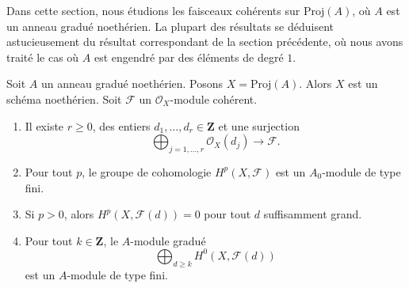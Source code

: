 \noindent
Dans cette section, nous étudions les faisceaux cohérents sur $\text{Proj}(A)$,
où $A$ est un anneau gradué noethérien. La plupart des résultats
se déduisent astucieusement du résultat correspondant de la section précédente,
où nous avons traité le cas où $A$ est engendré par des
éléments de degré $1$.

\begin{lemma}
\label{lemma-coherent-on-proj-general}
Soit $A$ un anneau gradué noethérien. Posons $X = \text{Proj}(A)$. Alors $X$
est un schéma noethérien. Soit $\mathcal{F}$ un $\mathcal{O}_X$-module cohérent.
\begin{enumerate}
\item Il existe $r \geq 0$, des entiers
$d_1, \ldots, d_r \in \mathbf{Z}$ et une surjection
$$
\bigoplus\nolimits_{j = 1, \ldots, r} \mathcal{O}_X(d_j)
\longrightarrow \mathcal{F}.
$$
\item Pour tout $p$, le groupe de cohomologie $H^p(X, \mathcal{F})$ est un
$A_0$-module de type fini.
\item Si $p > 0$, alors $H^p(X, \mathcal{F}(d)) = 0$ pour tout $d$ suffisamment grand.
\item Pour tout $k \in \mathbf{Z}$, le $A$-module gradué
$$
\bigoplus\nolimits_{d \geq k} H^0(X, \mathcal{F}(d))
$$
est un $A$-module de type fini.
\end{enumerate}
\end{lemma}

